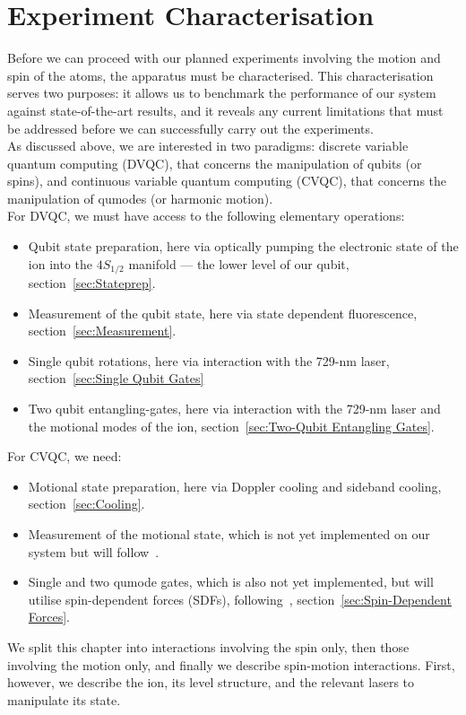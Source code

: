 \chapter{Experiment Characterisation}
\label{ch:Characterisation}
\minitoc

    Before we can proceed with our planned experiments involving the motion and
    spin of the atoms, the apparatus must be characterised. This characterisation
    serves two purposes: it allows us to benchmark the performance of our system
    against state-of-the-art results, and it reveals any current limitations
    that must be addressed before we can successfully carry out the experiments.\\
    As discussed above, we are interested in two paradigms: discrete variable quantum computing (DVQC), that concerns the manipulation of qubits (or spins), and continuous variable quantum computing (CVQC), that concerns the manipulation of qumodes (or harmonic motion).\\
    For DVQC, we must have access to the following elementary operations:
    \begin{itemize}
        \item Qubit state preparation, here via optically pumping the electronic state of the ion into the $4S_{1/2}$ manifold --- the lower level of our qubit, section~\ref{sec:Stateprep}.
        \item Measurement of the qubit state, here via state dependent fluorescence, section~\ref{sec:Measurement}.
        \item Single qubit rotations, here via interaction with the 729-nm laser, section~\ref{sec:Single Qubit Gates}
        \item Two qubit entangling-gates, here via interaction with the 729-nm laser and the motional modes of the ion, section~\ref{sec:Two-Qubit Entangling Gates}.
    \end{itemize}
     For CVQC, we need:
    \begin{itemize}
        \item Motional state preparation, here via Doppler cooling and sideband cooling, section~\ref{sec:Cooling}.
        \item Measurement of the motional state, which is not yet implemented on our system but will follow~\cite{fluhmann_direct_2020}.
        \item Single and two qumode gates, which is also not yet implemented, but will utilise spin-dependent forces (SDFs), following~\cite{sutherland_universal_2021}, section~\ref{sec:Spin-Dependent Forces}.
    \end{itemize}
    We split this chapter into interactions involving the spin only, then those involving the motion only, and finally we describe spin-motion interactions.
    First, however, we describe the ion, its level structure, and the relevant lasers to manipulate its state.



